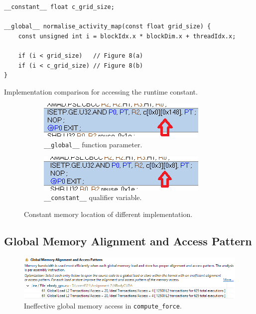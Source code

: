 \documentclass[12pt, a4paper]{article}
\begin{document}
\begin{listing}[H]
  \begin{verbatim}
__constant__ float c_grid_size;

__global__ normalise_activity_map(const float grid_size) {
    const unsigned int i = blockIdx.x * blockDim.x + threadIdx.x;

    if (i < grid_size)   // Figure 8(a)
    if (i < c_grid_size) // Figure 8(b)
}
  \end{verbatim}
  \caption{Implementation comparison for accessing the runtime constant.}
  \label{listing:compare_runtime_constant}
\end{listing}

\begin{figure}[ht]
  \begin{subfigure}{.5\textwidth}
    \centering
    \includegraphics[width=.9\linewidth]{images/constant_memory_before.png}
    \caption{\texttt{__global__} function parameter.}
  \end{subfigure}
  \begin{subfigure}{.5\textwidth}
    \centering
    \includegraphics[width=.9\linewidth]{images/constant_memory_after.png}
    \caption{\texttt{__constant__} qualifier variable.}
  \end{subfigure}
  \caption{Constant memory location of different implementation.}
  \label{figure:compare_runtime_constant}
\end{figure}

\subsection{Global Memory Alignment and Access Pattern}
\begin{figure}[H]
  \centering
  \includegraphics[width=\textwidth]{images/baseline_global_access_pattern.png}
  \caption{Ineffective global memory access in \texttt{compute\_force}.}
  \label{figure:baseline_memory_bandwidth_analysis}
\end{figure}
\end{document}
